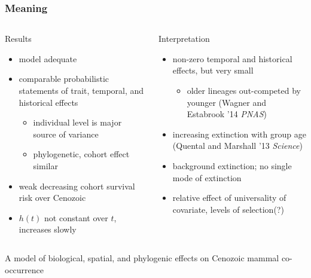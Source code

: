 \documentclass{beamer}
\begin{document}
\begin{frame}
  \frametitle{Meaning}
  \begin{columns}
    \begin{column}{0.5\textwidth}
      Results
      \begin{itemize}
        \item model adequate
        \item comparable probabilistic statements of trait, temporal, and historical effects
          \begin{itemize}
            \item individual level is major source of variance
            \item phylogenetic, cohort effect similar
          \end{itemize}
        \item weak decreasing cohort survival risk over Cenozoic
        \item \(h(t)\) not constant over \(t\), increases slowly
      \end{itemize}
    \end{column}
    \begin{column}{0.5\textwidth}
      Interpretation
      \begin{itemize}
        \item non-zero temporal and historical effects, but very small
          \begin{itemize}
            \item older lineages out-competed by younger (Wagner and Estabrook '14 \textit{PNAS})
          \end{itemize}
        \item increasing extinction with group age (Quental and Marshall '13 \textit{Science})
        \item background extinction; no single mode of extinction
        \item relative effect of universality of covariate, levels of selection(?)
      \end{itemize}
    \end{column}
  \end{columns}
\end{frame}


\begin{frame}
  A model of biological, spatial, and phylogenic effects on Cenozoic mammal co-occurrence
\end{frame}
\end{document}
